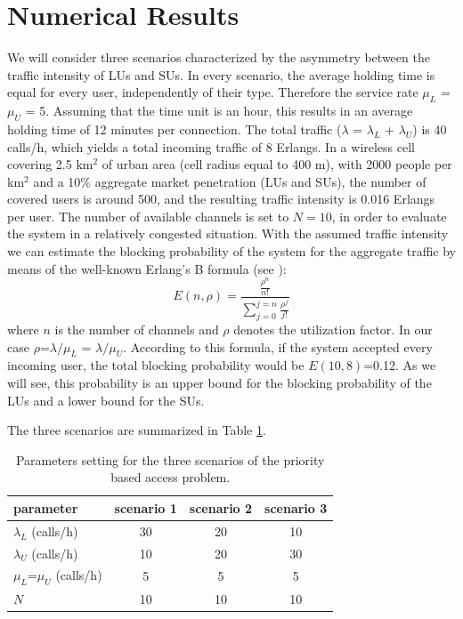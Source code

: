 \section{Numerical Results}\label{Sarnoff_sec_numerical}
We will consider three scenarios characterized by the asymmetry between the traffic intensity of LUs and SUs. In every scenario, the average holding time is equal for every user, independently of their type. Therefore the service rate $\mu_{L}$ =$\mu_{U}$ = 5. Assuming that the time unit is an hour, this results in an average holding time of 12 minutes per connection. The total traffic ($\lambda$ = $\lambda_{L}$ + $\lambda_{U}$) is 40 calls/h, which yields a total incoming traffic of 8 Erlangs. In a wireless cell covering 2.5 km$^{2}$ of urban area (cell radius equal to 400 m), with 2000 people per km$^{2}$ and a 10\% aggregate market penetration (LUs and SUs), the number of covered users is around 500, and the resulting traffic intensity is 0.016 Erlangs per user. The number of available channels is set to $N=10$, in order to evaluate the system in a relatively congested situation. With the assumed traffic intensity we can estimate the blocking probability of the system for the aggregate traffic by means of the well-known Erlang's B formula (see \cite{ref:Klei}):
\begin{equation}
E\left(n,\rho\right)=\displaystyle\frac{\frac{\rho^{n}}{n!}}{\sum_{j=0}^{j=n}\frac{\rho^{j}}{j!}}
\end{equation}
where $n$ is the number of channels and $\rho$ denotes the utilization factor. In our case $\rho$=$\lambda/\mu_{L}$ = $\lambda/\mu_{U}$. According to this formula, if the system accepted every incoming user, the total blocking probability would be $E\left(10,8\right)$=0.12. As we will see, this probability is an upper bound for the blocking probability of the LUs and a lower bound for the SUs.

The three scenarios are summarized in Table \ref{tab:table1}.

\begin{table}[h]
\centering
\begin{tabular}{|l|c|c|c|} \hline
 \textbf{parameter} & \textbf{scenario 1} & \textbf{scenario 2} & \textbf{scenario 3}\\\hline
$\lambda_{L}$ (calls/h) & 30 & 20 & 10\\\hline
$\lambda_{U}$ (calls/h) & 10 & 20 & 30\\\hline
$\mu_{L}$=$\mu_{U}$ (calls/h) & 5 & 5 & 5\\\hline
$N$ & 10 & 10 & 10\\\hline
\end{tabular}
\caption{Parameters setting for the three scenarios of the priority based access problem.}\label{tab:table1}
\centering
\end{table}

